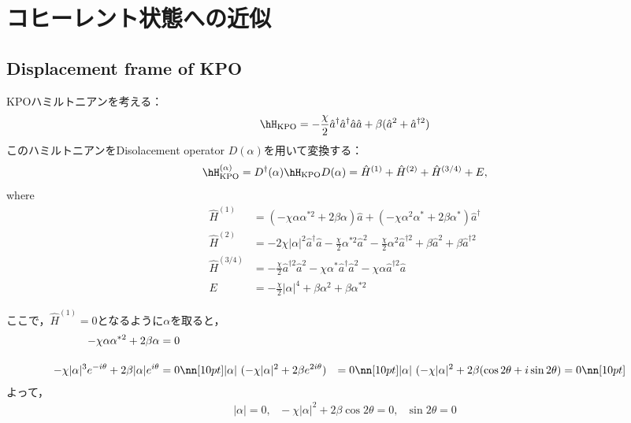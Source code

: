 \section{コヒーレント状態への近似}
\subsection{Displacement frame of KPO}
KPOハミルトニアンを考える：
\begin{equation}
    \hH_{\rm{KPO}}=- \frac{\chi}{2}
    \hat{a}^\dagger\hat{a}^\dagger\hat{a}\hat{a} + \beta (\hat{a}^2 + \hat{a}^{\dagger 2})
\end{equation}
このハミルトニアンをDisolacement operator $D(\alpha)$を用いて変換する：
\begin{equation}
    \hH_{\rm{KPO}}^{(\alpha)}=D^{\dag}(\alpha)\hH_{\rm{KPO}}D(\alpha)
    =\hat{H}^{(1)} + \hat{H}^{(2)} + \hat{H}^{(3/4)} + E,
\end{equation}
where
\begin{align}
    \hat{H}^{(1)}&=
    (- \chi\alpha\alpha^{\ast2}
    +2\beta\alpha)\hat{a}
    +(- \chi\alpha^2\alpha^{\ast}
    + 2\beta\alpha^{\ast})\hat{a}^{\dagger}
    \\[10pt]
    \hat{H}^{(2)}&=
    - 2\chi|\alpha|^2\hat{a}^{\dagger}\hat{a}- \frac{\chi}{2}\alpha^{\ast2}\hat{a}^2
    - \frac{\chi}{2}\alpha^2\hat{a}^{\dagger2}
    +\beta\hat{a}^2+\beta\hat{a}^{\dagger2}
    \\[10pt]
    \hat{H}^{(3/4)}&=
    - \frac{\chi}{2}\hat{a}^{\dagger2}\hat{a}^2 
    - \chi\alpha^{\ast}\hat{a}^{\dagger}\hat{a}^2
    - \chi\alpha\hat{a}^{\dagger2}\hat{a} 
    \\[10pt]
    E&=- \frac{\chi}{2}|\alpha|^4+\beta\alpha^2 
    +\beta\alpha^{\ast2}
\end{align}

ここで，$\hat{H}^{(1)}=0$となるように$\alpha$を取ると，
\begin{align}
    - \chi\alpha\alpha^{\ast2}
    +2\beta\alpha &= 0\\[10pt]
    - \chi|\alpha|^3e^{-i\theta}
    +2\beta |\alpha|e^{i\theta} &= 0\nn[10pt]
    |\alpha|\ (- \chi|\alpha|^2
    +2\beta e^{2i\theta} )&= 0\nn[10pt]
    |\alpha|\ (- \chi|\alpha|^2
    +2\beta (\cos{2\theta}+i\sin{2\theta})&= 0\nn[10pt]
\end{align}
よって，
\begin{align}
    |\alpha|=0,\ \ \  - \chi|\alpha|^2
    +2\beta\cos{2\theta}=0,\ \ \ \sin{2\theta}= 0
\end{align}

